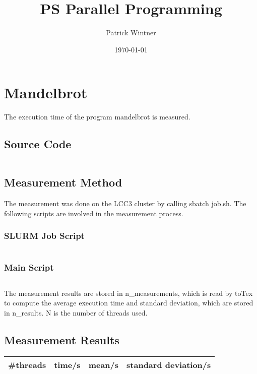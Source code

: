 \documentclass[parskip]{scrartcl}
\title{PS Parallel Programming}
\author{Patrick Wintner}
\date{\today}
\begin{document}
	\maketitle
	
	\section{Mandelbrot}
	The execution time of the program mandelbrot is measured.
	\subsection{Source Code}
	\inputminted{c}{mandelbrot/mandelbrot.c}
	\subsection{Measurement Method}
	The measurement was done on the LCC3 cluster by calling sbatch job.sh. The following scripts are involved in the measurement process.
	\subsubsection{SLURM Job Script}
	\inputminted{bash}{mandelbrot/job.sh}
	\subsubsection{Main Script}
	\inputminted{bash}{mandelbrot/main.sh}
	
	The measurement results are stored in n\_measurements, which is read by toTex to compute the average execution time and standard deviation, which are stored in n\_results. N is the number of threads used.
	
	\subsection{Measurement Results}
	\begin{tabular}{|c|c|c|c|}
		\hline \#threads & time/s & mean/s & standard deviation/s\\
		\hline
	\end{tabular}
\end{document}
